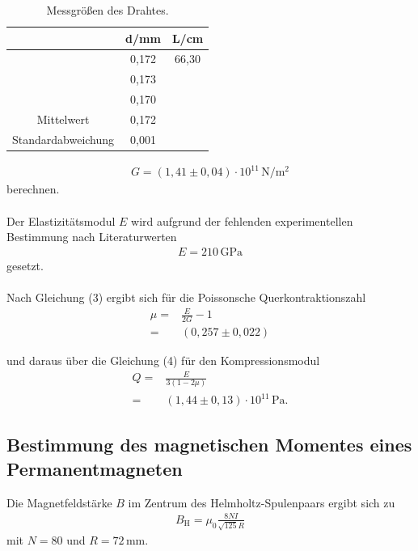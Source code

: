 \begin{table}
\centering
\caption{Messgrößen des Drahtes.}
\label{tab:ohnebfeld}
\begin{tabular}{c c c}
\toprule
 & d\:/\:mm & L\:/\:cm\\
\midrule
 & 0,172 & 66,30 \\
 & 0,173 &  \\
 & 0,170 & \\
\hline
Mittelwert & 0,172 & \\
Standardabweichung & 0,001 & \\
\bottomrule
\end{tabular}
\end{table}

\begin{align*}
G = (1,41 \pm 0,04) \cdot 10^{11}\,\si{\newton\per\meter\squared}
\end{align*}
berechnen.\\~\\

\noindent Der Elastizitätsmodul $E$ wird aufgrund der fehlenden experimentellen Bestimmung nach Literaturwerten
\begin{align*}
E = 210\,\si{\giga\pascal}
\end{align*}
gesetzt.
\\~\\
\noindent Nach Gleichung (3) ergibt sich für die Poissonsche Querkontraktionszahl
\begin{align*}
\mu = {} & \frac{E}{2G} - 1 \\
    = {} & (0,257 \pm 0,022)
\end{align*}

\noindent und daraus über die Gleichung (4) für den Kompressionsmodul
\begin{align*}
Q = {} & \frac{E}{3(1-2\mu)}\\
  = {} & (1,44 \pm 0,13) \cdot 10^{11}\,\si{\pascal} .
\end{align*}

\subsection{Bestimmung des magnetischen Momentes eines Permanentmagneten}
Die Magnetfeldstärke $B$ im Zentrum des Helmholtz-Spulenpaars ergibt sich zu
\begin{align*}
B_\text{H} = \mu_0 \frac{8NI}{\sqrt{125} R }
\end{align*}
mit $N=80$ und $R=72\,\si{\milli\meter}$.

